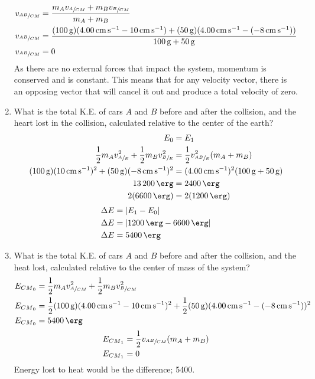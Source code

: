 \documentclass{article}
\begin{document}
\begin{enumerate}[label = \textbf{(\alph*)}]
\begin{align*}
			v_{\sfrac{AB}{CM}} & = \frac{ m_Av_{\sfrac{A}{CM}} + m_Bv_{\sfrac{B}{CM}} }{ m_A + m_B } \\
			v_{\sfrac{AB}{CM}} & = \frac{ (\SI{100}{\gram})(\SI{4.00}{\centi \meter \per \second} - \SI{10}{\centi \meter \per \second}) + (\SI{50}{\gram})(\SI{4.00}{\centi \meter \per \second} - (\SI{-8}{\centi \meter \per \second})) }{ \SI{100}{\gram} + \SI{50}{\gram} } \\
			v_{\sfrac{AB}{CM}} & = 0
		\end{align*}
		As there are no external forces that impact the system, momentum is conserved and is constant. This means that for any velocity vector, there is an opposing vector that will cancel it out and produce a total velocity of zero.
	\item What is the total K.E. of cars $ A $ and $ B $ before and after the collision, and the heart lost in the collision, calculated relative to the center of the earth?
		\begin{align*}
			E_0 & = E_1 \\
			\frac{1}{2}m_Av_{\sfrac{A}{E}}^2 + \frac{1}{2}m_Bv_{\sfrac{B}{E}}^2 & = \frac{1}{2}v_{\sfrac{AB}{E}}^2(m_A + m_B) \\
			(\SI{100}{\gram})(\SI{10}{\centi \meter \per \second})^2 + (\SI{50}{\gram})(\SI{-8}{\centi \meter \per \second})^2 & = (\SI{4.00}{\centi \meter \per \second})^2(\SI{100}{\gram} + \SI{50}{\gram}) \\
			\SI{13200}{\erg} & = \SI{2400}{\erg} \\
			2(\SI{6600}{\erg}) & = 2(\SI{1200}{\erg})
		\end{align*}
		\begin{align*}
			\Delta E & = \left| E_1 - E_0 \right| \\
			\Delta E & = \left| \SI{1200}{\erg} - \SI{6600}{\erg} \right| \\
			\Delta E & = \SI{5400}{\erg}
		\end{align*}
	\item What is the total K.E. of cars $ A $ and $ B $ before and after the collision, and the heat lost, calculated relative to the center of mass of the system?
		\begin{align*}
			E_{{CM}_0} & = \frac{1}{2}m_Av_{\sfrac{A}{CM}}^2 + \frac{1}{2}m_Bv_{\sfrac{B}{CM}}^2 \\
			E_{{CM}_0} & = \frac{1}{2}(\SI{100}{\gram})(\SI{4.00}{\centi \meter \per \second} - \SI{10}{\centi \meter \per \second})^2 + \frac{1}{2}(\SI{50}{\gram})(\SI{4.00}{\centi \meter \per \second} - (\SI{-8}{\centi \meter \per \second}))^2 \\
			E_{{CM}_0} & = \SI{5400}{\erg}
		\end{align*}
		\begin{align*}
			E_{{CM}_1} & = \frac{1}{2}v_{\sfrac{AB}{CM}}(m_A + m_B) \\
			E_{{CM}_1} & = 0
		\end{align*}
		Energy lost to heat would be the difference; \SI{5400}{\erg}.
\end{enumerate}
\end{document}
